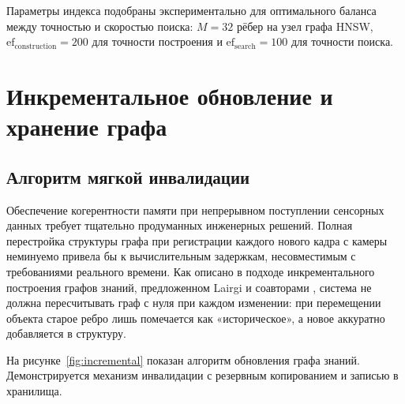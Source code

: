 Параметры индекса подобраны экспериментально для оптимального баланса между точностью и скоростью поиска: $\displaystyle M = 32$ рёбер на узел графа HNSW, $\displaystyle \text{ef}_{\text{construction}} = 200$ для точности построения и $\displaystyle \text{ef}_{\text{search}} = 100$ для точности поиска.


\section{Инкрементальное обновление и хранение графа}
\label{sec:incremental}

\subsection{Алгоритм мягкой инвалидации}

Обеспечение когерентности памяти при непрерывном поступлении сенсорных данных требует тщательно продуманных инженерных решений. Полная перестройка структуры графа при регистрации каждого нового кадра с камеры неминуемо привела бы к вычислительным задержкам, несовместимым с требованиями реального времени. Как описано в подходе инкрементального построения графов знаний, предложенном Lairgi и соавторами \cite{ref35}, система не должна пересчитывать граф с нуля при каждом изменении: при перемещении объекта старое ребро лишь помечается как «историческое», а новое аккуратно добавляется в структуру.

На рисунке~\ref{fig:incremental} показан алгоритм обновления графа знаний. Демонстрируется механизм инвалидации с резервным копированием и записью в хранилища.

